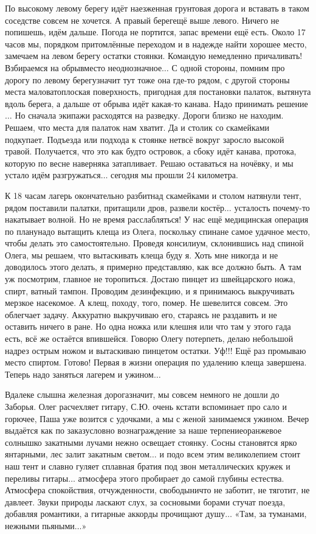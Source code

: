 По высокому левому берегу идёт наезженная грунтовая дорога и вставать в таком соседстве совсем не хочется. А правый берег\mdash ещё выше левого. Ничего не попишешь, идём дальше. Погода не портится, запас времени ещё есть. Около 17 часов мы, порядком притомлённые переходом и в надежде найти хорошее место, замечаем на левом берегу остатки стоянки. Командую немедленно причаливать! Взбираемся на обрыв\mdash место неоднозначное$\ldots$ С одной стороны, помним про дорогу по левому берегу\mdash значит тут тоже она где-то рядом, с другой стороны места маловато\mdash плоская поверхность, пригодная для постановки палаток, вытянута вдоль берега, а дальше от обрыва идёт какая-то канава. Надо принимать решение$\ldots$ Но сначала экипажи расходятся на разведку. Дороги близко не находим. Решаем, что места для палаток нам хватит. Да и столик со скамейками подкупает. Подъезда или подхода к стоянке нет\mdash всё вокруг заросло высокой травой. Получается, что это как будто островок, а сбоку идёт канава, протока, которую по весне наверняка затапливает. Решаю оставаться на ночёвку, и мы устало идём разгружаться$\ldots$ сегодня мы прошли 24 километра.

К 18 часам лагерь окончательно разбит\mdash над скамейками и столом натянули тент, рядом поставили палатки, притащили дров, развели костёр$\ldots$ усталость почему-то накатывает волной. Но не время расслабляться! У нас ещё медицинская операция по плану\mdash надо вытащить клеща из Олега, поскольку спина\mdash не самое удачное место, чтобы делать это самостоятельно. Проведя консилиум, склонившись над спиной Олега, мы решаем, что вытаскивать клеща буду я. Хоть мне никогда и не доводилось этого делать, я примерно представляю, как все должно быть. А там уж посмотрим, главное не торопиться. Достаю пинцет из швейцарского ножа, спирт, ватный тампон. Проводим дезинфекцию, и я принимаюсь выкручивать мерзкое насекомое. А клещ, походу, того, помер. Не шевелится совсем. Это облегчает задачу. Аккуратно выкручиваю его, стараясь не раздавить и не оставить ничего в ране. Но одна ножка или клешня или что там у этого гада есть, всё же остаётся впившейся. Говорю Олегу потерпеть, делаю небольшой надрез острым ножом и вытаскиваю пинцетом остатки. Уф!!! Ещё раз промываю место спиртом. Готово! Первая в жизни операция по удалению клеща завершена. Теперь надо заняться лагерем и ужином$\ldots$

Вдалеке слышна железная дорога\mdash значит, мы совсем немного не дошли до Заборья. Олег расчехляет гитару, С.Ю. очень кстати вспоминает про сало и горючее, Паша уже возится с удочками, а мы с женой занимаемся ужином. Вечер выдаётся как по заказу\mdash словно вознаграждение за наше терпение\mdash оранжевое солнышко закатными лучами нежно освещает стоянку. Сосны становятся ярко янтарными, лес залит закатным светом$\ldots$ и подо всем этим великолепием стоит наш тент и славно гуляет сплавная братия под звон металлических кружек и переливы гитары$\ldots$ атмосфера этого пробирает до самой глубины естества. Атмосфера спокойствия, отчужденности, свободы\mdash ничто не заботит, не тяготит, не давлеет. Звуки природы ласкают слух, за сосновыми борами стучат поезда, добавляя романтики, а гитарные аккорды прочищают душу$\ldots$ «Там, за туманами, нежными пьяными$\ldots$»

